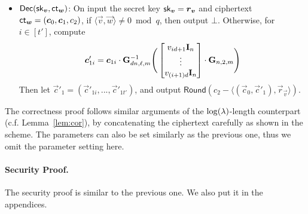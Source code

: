 \begin{itemize}[leftmargin=*]
\item $\mathsf{Dec}(\mathsf{sk}_{\boldsymbol{v}}, \mathsf{ct}_{\boldsymbol{w}})$: On input the secret key $\mathsf{sk}_{\boldsymbol{v}} = \boldsymbol{r}_{\boldsymbol{v}}$ and ciphertext $\mathsf{ct}_{\boldsymbol{w}} = (\boldsymbol{c}_0, \boldsymbol{c}_1, c_2)$, if $\langle \vec{v}, \vec{w} \rangle \neq 0 \bmod q$, then output $\bot$. Otherwise, for $i \in [t']$, compute
$$\boldsymbol{c}'_{1i} = \boldsymbol{c}_{1i} \cdot \mathbf{G}_{dn, \ell, m}^{-1}
 \Bigg(\begin{bmatrix}
v_{id + 1}\mathbf{I}_n \\
\vdots \\
v_{(i + 1)d}\mathbf{I}_n
\end{bmatrix} \cdot \mathbf{G}_{n, 2, m}\Bigg)$$
Then let $\vec{c}'_1 = (\vec{c}'_{1i},..., \vec{c}'_{1t'})$, and output $\mathsf{Round}(c_2 - \langle (\vec{c}_0, \vec{c}'_1), \vec{r}_{\vec{v}} \rangle)$.
\end{itemize}
The correctness proof follows similar arguments of the $\log(\lambda)$-length counterpart (c.f. Lemma~\ref{lem:cor}), by  concatenating the ciphertext carefully as shown in the scheme. The parameters can also be set similarly as the previous one, thus we omit the parameter setting here.

\paragraph{Security Proof.} The security proof is similar to the previous one. We also put it in the appendices.


